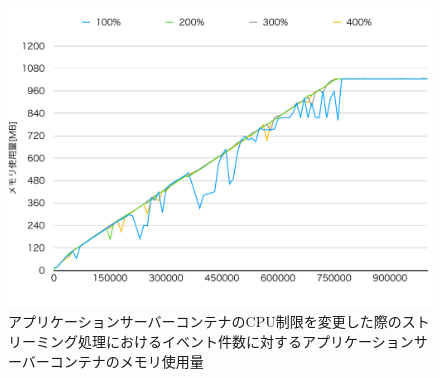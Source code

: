 \documentclass[../../../../../main]{subfiles}
\begin{document}
    \begin{figure}[H]
        \centering
        \includegraphics[width=12cm]{graph}
        \caption{アプリケーションサーバーコンテナのCPU制限を変更した際のストリーミング処理におけるイベント件数に対するアプリケーションサーバーコンテナのメモリ使用量}
        \label{fig:stream-change-app-cpu-limit-app-memory-app_1024-db_1_1024}
    \end{figure}
\end{document}
